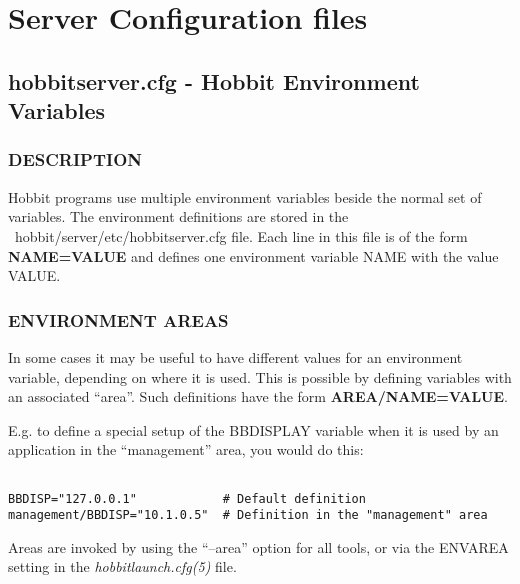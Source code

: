 %
\chapter{Server Configuration files}

%

\section{hobbitserver.cfg - Hobbit Environment Variables }

 
\subsection{DESCRIPTION}
 Hobbit programs use multiple environment variables beside the normal
 set of variables. The environment definitions are stored in the
 ~hobbit/server/etc/hobbitserver.cfg file. Each line in this file is
 of the form \textbf{NAME=VALUE} and defines one environment variable
 NAME with the value VALUE. 


 
\subsection{ENVIRONMENT AREAS}
 In some cases it may be useful to have different values for an
 environment variable, depending on where it is used. This is possible
 by defining variables with an associated ``area''. Such definitions
 have the form \textbf{AREA/NAME=VALUE}. 


  E.g. to define a special setup of the BBDISPLAY variable when it is
  used by an application in the ``management'' area, you would do
  this: 

\begin{verbatim}

BBDISP="127.0.0.1"            # Default definition
management/BBDISP="10.1.0.5"  # Definition in the "management" area

\end{verbatim}



Areas are invoked by using the ``--area'' option for all tools, or via
the ENVAREA setting in the \emph{hobbitlaunch.cfg(5)} file. 


